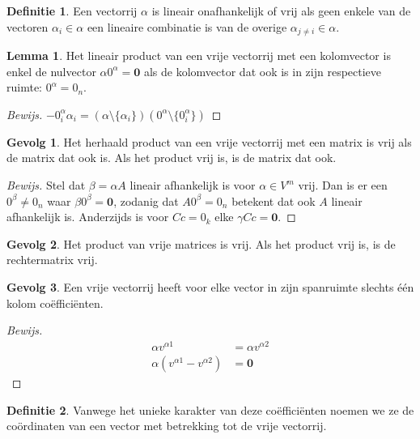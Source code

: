 \documentclass{amsart}
\theoremstyle{definition}
\newtheorem{lmm}{Lemma}[section]
\newtheorem{dfn}{Definitie}[section]
\newtheorem{csq}{Gevolg}[section]
\newcommand{\zerovec}{\mathbf{0}}
\newcommand{\without}[1]{\setminus\{#1\}}
\newenvironment{bewijs}{\begin{proof}[Bewijs]}{\end{proof}}
\begin{document}
\begin{dfn}
	Een vectorrij $\alpha$ is lineair onafhankelijk of vrij als geen enkele van de vectoren $\alpha_i \in \alpha$ een lineaire combinatie is van de overige $\alpha_{j\neq i} \in \alpha$.
\end{dfn}

\begin{lmm}
	Het lineair product van een vrije vectorrij met een kolomvector is enkel de nulvector $\alpha 0^\alpha = \zerovec$ als de kolomvector dat ook is in zijn respectieve ruimte: $0^\alpha = 0_n$.
	\begin{bewijs}
		$-0^\alpha_i \alpha_i = \left(\alpha \without{\alpha_i}\right)\left(0^\alpha \without{0^\alpha_i}\right)$
	\end{bewijs}
\end{lmm}

\begin{csq}
	Het herhaald product van een vrije vectorrij met een matrix is vrij als de matrix dat ook is. Als het product vrij is, is de matrix dat ook.
	\begin{bewijs}
		Stel dat $\beta = \alpha A$ lineair afhankelijk is voor $\alpha \in V^m$ vrij.
		Dan is er een $0^\beta \neq 0_n$ waar $\beta0^\beta = \zerovec$, zodanig dat $A 0^\beta = 0_n$ betekent dat ook $A$ lineair afhankelijk is.
		Anderzijds is voor $Cc = 0_k$ elke $\gamma Cc = \zerovec$.
	\end{bewijs}
\end{csq}

\begin{csq}
	Het product van vrije matrices is vrij. Als het product vrij is, is de rechtermatrix vrij.
\end{csq}

\begin{csq}
	Een vrije vectorrij heeft voor elke vector in zijn spanruimte slechts één kolom coëfficiënten.
	\begin{bewijs}
		\begin{align*}
			\alpha v^{\alpha 1}                  & = \alpha v^{\alpha 2} \\
			\alpha (v^{\alpha 1} - v^{\alpha 2}) & = \zerovec
		\end{align*}
	\end{bewijs}
\end{csq}

\begin{dfn}
	Vanwege het unieke karakter van deze coëfficiënten noemen we ze de coördinaten van een vector met betrekking tot de vrije vectorrij.
\end{dfn}
\end{document}
